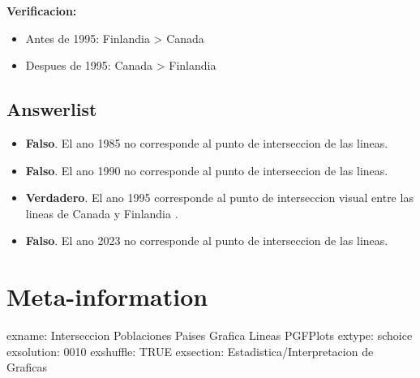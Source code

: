 \documentclass[
]{article}
\providecommand{\tightlist}{%
  \setlength{\itemsep}{0pt}\setlength{\parskip}{0pt}}
\begin{document}
\textbf{Verificacion:}

\begin{itemize}
\tightlist
\item
  Antes de 1995: Finlandia \textgreater{} Canada
\item
  Despues de 1995: Canada \textgreater{} Finlandia
\end{itemize}

\subsection{Answerlist}\label{answerlist-1}

\begin{itemize}
\tightlist
\item
  \textbf{Falso}. El ano 1985 no corresponde al punto de interseccion de
  las lineas.
\item
  \textbf{Falso}. El ano 1990 no corresponde al punto de interseccion de
  las lineas.
\item
  \textbf{Verdadero}. El ano 1995 corresponde al punto de interseccion
  visual entre las lineas de Canada y Finlandia .
\item
  \textbf{Falso}. El ano 2023 no corresponde al punto de interseccion de
  las lineas.
\end{itemize}

\section{Meta-information}\label{meta-information}

exname: Interseccion Poblaciones Paises Grafica Lineas PGFPlots extype:
schoice exsolution: 0010 exshuffle: TRUE exsection:
Estadistica/Interpretacion de Graficas
\end{document}
